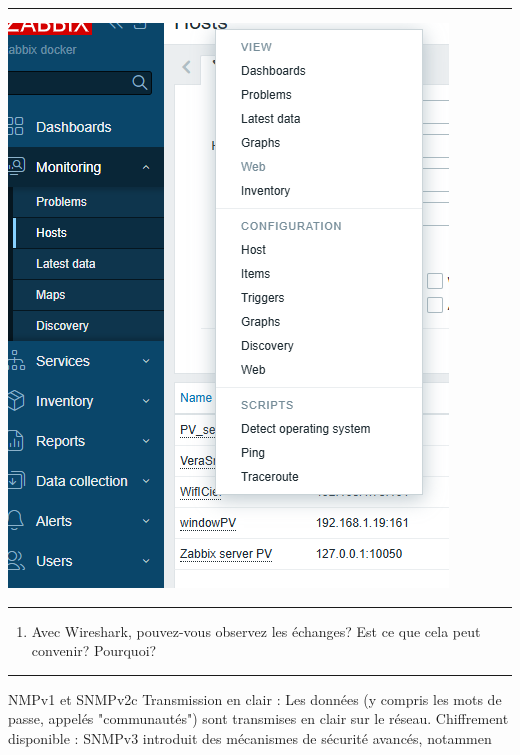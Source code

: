 \documentclass[french, 12pt]{article}%
\newif\ifPROF
\begin{document}
\begin{center}
 \rule{0.75\linewidth}{1pt}
 \end{center}

\begin{center}
\includegraphics[scale=0.4]{./ressource/zabbixObservation}
\end{center}


\begin{center}
 \rule{0.75\linewidth}{1pt}
 \end{center}

\begin{enumerate}[resume]
\item Avec Wireshark, pouvez-vous observez les échanges? Est ce que cela peut convenir? Pourquoi? 
\end{enumerate}

\begin{center}
 \rule{0.75\linewidth}{1pt}
 \end{center}

\ifPROF
\color{red}
NMPv1 et SNMPv2c
Transmission en clair : Les données (y compris les mots de passe, appelés "communautés") sont transmises en clair sur le réseau.
Chiffrement disponible : SNMPv3 introduit des mécanismes de sécurité avancés, notammen
\end{document}
